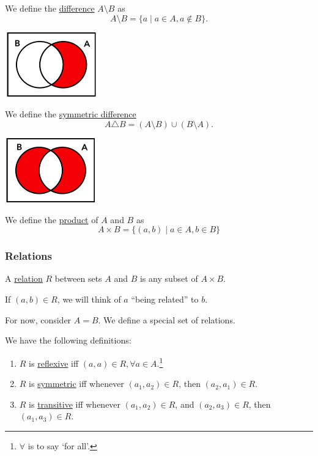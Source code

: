 \begin{definition}
    We define the \ul{difference} $A\setminus B$ as
    \[A\setminus B = \{a\mid a\in A, a\not\in B\}.\]
    \begin{center}
        \includegraphics[width=0.3\textwidth]{images/set_difference.png}
    \end{center}
\end{definition}
\begin{definition}
    We define the \ul{symmetric difference}
    \[A\triangle B = (A\setminus B)\cup (B\setminus A).\]
    \begin{center}
        \includegraphics[width=0.3\textwidth]{images/set_sym_difference.png}
    \end{center}
\end{definition}
\begin{definition}
    We define the \ul{product} of $A$ and $B$ as
    \[A\times B = \{(a, b)\mid a\in A, b\in B\}\]
\end{definition}

\subsubsection{Relations}
\begin{definition}[Relations]
    A \ul{relation} $R$ between sets $A$ and $B$ is any subset of $A\times B$.

    If $(a, b)\in R$, we will think of $a$ ``being related'' to $b$.
\end{definition}

For now, consider $A = B$. We define a special set of relations.
\begin{definition}\label{defn:rst-relations}
    We have the following definitions:
    \begin{enumerate}
        \item $R$ is \ul{reflexive} iff $(a, a)\in R, \forall a\in A$.\footnote{$\forall$ is to say `for all'.}
        \item $R$ is \ul{symmetric} iff whenever $(a_1, a_2)\in R$, then $(a_2, a_1)\in R$.
        \item $R$ is \ul{transitive} iff whenever $(a_1, a_2)\in R$, and $(a_2, a_3)\in R$, then $(a_1, a_3)\in R$.
    \end{enumerate}
\end{definition}

